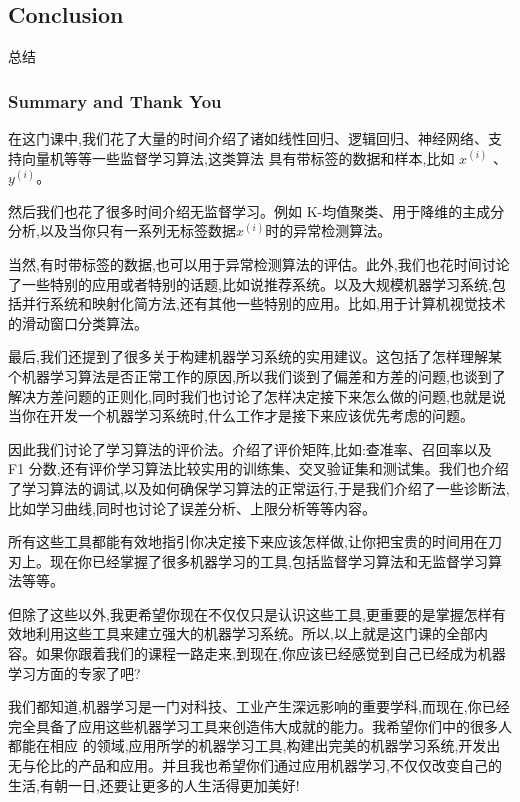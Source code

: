 \documentclass{article}
\begin{document}
\begin{CJK}{UTF8}{gbsn}
\newpage
\part{Conclusion}
\subparagraph{}
总结
\section{Summary and Thank You}
\begin{figure}[H]
\label{fig:2290}
\end{figure}
\subparagraph{}
在这门课中,我们花了大量的时间介绍了诸如线性回归、逻辑回归、神经网络、支持向量机等等一些监督学习算法,这类算法
具有带标签的数据和样本,比如 $x^{(i)}$ 、$y^{(i)}$。
\subparagraph{}
然后我们也花了很多时间介绍无监督学习。例如 K-均值聚类、用于降维的主成分分析,以及当你只有一系列无标签数据$x^{(i)}$时的异常检测算法。
\subparagraph{}
当然,有时带标签的数据,也可以用于异常检测算法的评估。此外,我们也花时间讨论了一些特别的应用或者特别的话题,比如说推荐系统。以及大规模机器学习系统,包括并行系统和映射化简方法,还有其他一些特别的应用。比如,用于计算机视觉技术的滑动窗口分类算法。
\subparagraph{}
最后,我们还提到了很多关于构建机器学习系统的实用建议。这包括了怎样理解某个机器学习算法是否正常工作的原因,所以我们谈到了偏差和方差的问题,也谈到了解决方差问题的正则化,同时我们也讨论了怎样决定接下来怎么做的问题,也就是说当你在开发一个机器学习系统时,什么工作才是接下来应该优先考虑的问题。
\subparagraph{}
因此我们讨论了学习算法的评价法。介绍了评价矩阵,比如:查准率、召回率以及 F1 分数,还有评价学习算法比较实用的训练集、交叉验证集和测试集。我们也介绍了学习算法的调试,以及如何确保学习算法的正常运行,于是我们介绍了一些诊断法,比如学习曲线,同时也讨论了误差分析、上限分析等等内容。
\subparagraph{}
所有这些工具都能有效地指引你决定接下来应该怎样做,让你把宝贵的时间用在刀刃上。现在你已经掌握了很多机器学习的工具,包括监督学习算法和无监督学习算法等等。
\subparagraph{}
但除了这些以外,我更希望你现在不仅仅只是认识这些工具,更重要的是掌握怎样有效地利用这些工具来建立强大的机器学习系统。所以,以上就是这门课的全部内容。如果你跟着我们的课程一路走来,到现在,你应该已经感觉到自己已经成为机器学习方面的专家了吧?
\subparagraph{}
我们都知道,机器学习是一门对科技、工业产生深远影响的重要学科,而现在,你已经完全具备了应用这些机器学习工具来创造伟大成就的能力。我希望你们中的很多人都能在相应
的领域,应用所学的机器学习工具,构建出完美的机器学习系统,开发出无与伦比的产品和应用。并且我也希望你们通过应用机器学习,不仅仅改变自己的生活,有朝一日,还要让更多的人生活得更加美好!
\end{CJK}
\end{document}

